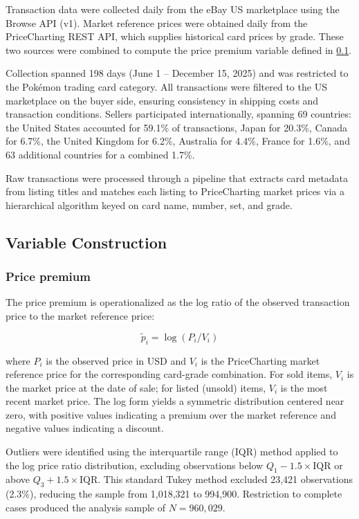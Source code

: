 \documentclass[11pt,letterpaper]{article}
\theoremstyle{definition}
\begin{document}
Transaction data were collected daily from the eBay US marketplace using the Browse API (v1). Market reference prices were obtained daily from the PriceCharting REST API, which supplies historical card prices by grade. These two sources were combined to compute the price premium variable defined in \ref{subsec:emp-B}.

Collection spanned 198 days (June 1 -- December 15, 2025) and was restricted to the Pokémon trading card category. All transactions were filtered to the US marketplace on the buyer side, ensuring consistency in shipping costs and transaction conditions. Sellers participated internationally, spanning 69 countries: the United States accounted for 59.1\% of transactions, Japan for 20.3\%, Canada for 6.7\%, the United Kingdom for 6.2\%, Australia for 4.4\%, France for 1.6\%, and 63 additional countries for a combined 1.7\%.

Raw transactions were processed through a pipeline that extracts card metadata from listing titles and matches each listing to PriceCharting market prices via a hierarchical algorithm keyed on card name, number, set, and grade.

\subsection{Variable Construction}\label{subsec:emp-B}

\subsubsection{Price premium}

The price premium is operationalized as the log ratio of the observed transaction price to the market reference price:

\begin{equation}
\widetilde{p}_i = \log(P_i / V_i) \label{eq:s1}
\end{equation}

where $P_i$ is the observed price in USD and $V_i$ is the PriceCharting market reference price for the corresponding card-grade combination. For sold items, $V_i$ is the market price at the date of sale; for listed (unsold) items, $V_i$ is the most recent market price. The log form yields a symmetric distribution centered near zero, with positive values indicating a premium over the market reference and negative values indicating a discount.

Outliers were identified using the interquartile range (IQR) method applied to the log price ratio distribution, excluding observations below $Q_1 - 1.5 \times \mathrm{IQR}$ or above $Q_3 + 1.5 \times \mathrm{IQR}$. This standard Tukey method excluded 23,421 observations (2.3\%), reducing the sample from 1,018,321 to 994,900. Restriction to complete cases produced the analysis sample of $N = 960{,}029$.
\end{document}
